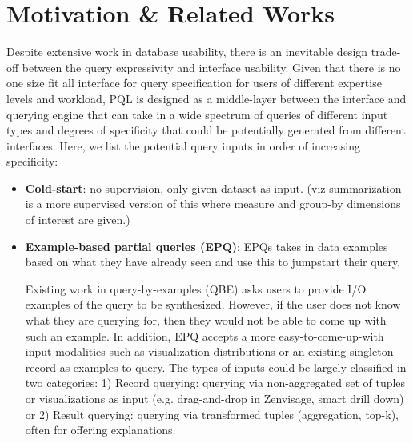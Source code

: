 \documentclass{sig-alternate-05-2015}
\begin{document}
\section{Motivation \& Related Works}
\par Despite extensive work in database usability, there is an inevitable design trade-off between the query expressivity and interface usability\cite{Jagadish2007,Morton2014}. Given that there is no one size fit all interface for query specification for users of different expertise levels and workload, PQL is designed as a middle-layer between the interface and querying engine that can take in a wide spectrum of queries of different input types and degrees of specificity that could be potentially generated from different interfaces. Here, we list the potential query inputs in order of increasing specificity: 
\begin{itemize}
\item \textbf{Cold-start}: no supervision, only given dataset as input. (viz-summarization is a more supervised version of this where measure and group-by dimensions of interest are given.)
\item \textbf{Example-based partial queries (EPQ)}: EPQs takes in data examples based on what they have already seen and use this to jumpstart their query. 
\par Existing work in query-by-examples (QBE) asks users to provide I/O examples of the query to be synthesized\cite{Wang2017a,Wang2017}. However, if the user does not know what they are querying for, then they would not be able to come up with such an example. In addition, EPQ accepts a more easy-to-come-up-with input modalities such as visualization distributions or an existing singleton record as examples to query. The types of inputs could be largely classified in two categories: 1) Record querying: querying via non-aggregated set of tuples or visualizations as input (e.g. drag-and-drop in Zenvisage, smart drill down) or 2) Result querying: querying via transformed tuples (aggregation, top-k), often for offering explanations\cite{Chapman2009,Wu2013,Roy2015}.

\end{itemize}
\end{document}
